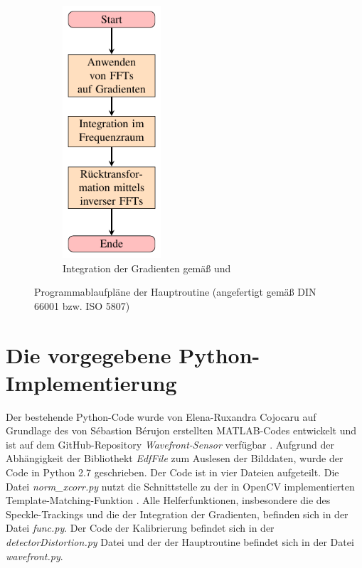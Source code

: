 \begin{figure}[h!]
\begin{subfigure}[b]{0.45\textwidth}
		\includegraphics[width=0.4\textwidth]{pdf/graph_fc}
		\caption[Frankot-Chellappa]{Integration der Gradienten gemäß \cite{FC88} und \cite{Kov04}}
		\label{fig:graph_fc}
	\end{subfigure}
	\caption[Algorithmen]{Programmablaufpläne der Hauptroutine (angefertigt gemäß DIN 66001 bzw. ISO 5807)}
\end{figure}

\section{Die vorgegebene Python-Implementierung}

Der bestehende Python-Code wurde von Elena-Ruxandra Cojocaru auf Grundlage des von Sébastion Bérujon erstellten MATLAB-Codes entwickelt und ist auf dem GitHub-Repository \textit{Wavefront-Sensor} verfügbar \cite{Coj17}. Aufgrund der Abhängigkeit der Bibliothekt \textit{EdfFile} zum Auslesen der Bilddaten, wurde der Code in Python 2.7 geschrieben. Der Code ist in vier Dateien aufgeteilt. Die Datei \textit{norm\_xcorr.py} nutzt die Schnittstelle zu der in OpenCV implementierten Template-Matching-Funktion \cite{SA17}. Alle Helferfunktionen, insbesondere die des Speckle-Trackings und die der Integration der Gradienten, befinden sich in der Datei \textit{func.py}. Der Code der Kalibrierung befindet sich in der \textit{detectorDistortion.py} Datei und der der Hauptroutine befindet sich in der Datei \textit{wavefront.py}. 

